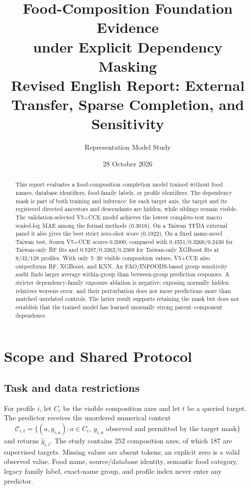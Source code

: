 \documentclass[11pt]{article}
\title{\textbf{Food-Composition Foundation Evidence\\under Explicit Dependency Masking}\\
\large Revised English Report: External Transfer, Sparse Completion, and Sensitivity}
\author{Representation Model Study}
\date{28 October 2026}
\begin{document}
\maketitle

\begin{abstract}
This report evaluates a food-composition completion model trained without food names, database identifiers, food-family labels, or profile identifiers. The dependency mask is part of both training and inference: for each target axis, the target and its registered directed ancestors and descendants are hidden, while siblings remain visible. The validation-selected V5+CCE model achieves the lowest complete-test macro scaled-log MAE among the formal methods (0.3016). On a Taiwan TFDA external panel it also gives the best strict zero-shot score (0.1922). On a fixed name-novel Taiwan test, frozen V5+CCE scores 0.2000, compared with 0.4551/0.3266/0.2430 for Taiwan-only RF fits and 0.5287/0.3262/0.2369 for Taiwan-only XGBoost fits at 8/32/128 profiles. With only 5--20 visible composition values, V5+CCE also outperforms RF, XGBoost, and KNN. An FAO/INFOODS-based group sensitivity audit finds larger average within-group than between-group prediction responses. A stricter dependency-family exposure ablation is negative: exposing normally hidden relatives worsens error, and their perturbation does not move predictions more than matched unrelated controls. The latter result supports retaining the mask but does not establish that the trained model has learned unusually strong parent--component dependence.
\end{abstract}

\section{Scope and Shared Protocol}

\subsection{Task and data restrictions}

For profile $i$, let $C_i$ be the visible composition axes and let $t$ be a queried target. The predictor receives the unordered numerical context
\begin{equation}
  \mathcal{C}_{i,t}=\{(a,y_{i,a}):a\in C_i,\ y_{i,a}\text{ observed and permitted by the target mask}\}
\end{equation}
and returns $\hat y_{i,t}$. The study contains 252 composition axes, of which 187 are supervised targets. Missing values are absent tokens; an explicit zero is a valid observed value. Food name, source/database identity, semantic food category, legacy family label, exact-name group, and profile index never enter any predictor.
\end{document}
